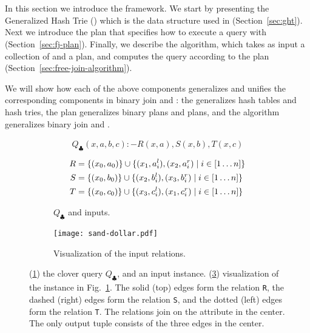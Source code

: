 \section{\FJ}\label{sec:free-join}

In this section we introduce the \FJ framework.
We start by presenting the Generalized Hash Trie (\GHT) which
 is the data structure used in \FJ (Section~\ref{sec:ght}).
Next we introduce the \FJ plan that specifies 
  how to execute a query with \FJ (Section~\ref{sec:fj-plan}).
Finally, we describe the \FJ algorithm, 
  which takes as input a collection of \GHTs 
  and a \FJ plan,
  and computes the query according to the plan (Section~\ref{sec:free-join-algorithm}).
  
We will show how each of the above components generalizes 
  and unifies the corresponding components in binary join 
  and \GJ: 
  the \GHT generalizes hash tables and hash tries,
  the \FJ plan generalizes binary plans and \GJ plans, and
  the \FJ algorithm generalizes binary join and \GJ.

\begin{figure}
\begin{subfigure}[b]{0.4\linewidth}
\begin{align*}
  Q_{\clubsuit}(x,a,b,c) :- R(x,a),S(x,b),T(x,c)
\end{align*}
\begin{align*}
  R & = \{(x_0, a_0)\} \cup \{{(x_1, a_i^l), (x_2, a_i^r)}\mid{i \in [1 \ldots n]}\} \\
  S & = \{(x_0, b_0)\} \cup \{{(x_2, b_i^l), (x_3, b_i^r)}\mid{i \in [1 \ldots n]}\} \\
  T & = \{(x_0, c_0)\} \cup \{{(x_3, c_i^l), (x_1, c_i^r)}\mid{i \in [1 \ldots n]}\} 
\end{align*}
\caption{$Q_\clubsuit$ and inputs.}
\label{fig:clover-query}
\end{subfigure}
\begin{subfigure}[b]{0.5\linewidth}
  \centering
  \texttt{[image: sand-dollar.pdf]}
  \caption{Visualization of the input relations.}
  \label{fig:clover-vis}
\end{subfigure}
\caption{(\ref{fig:clover-query}) the clover query $Q_\clubsuit$, and an input instance.
(\ref{fig:clover-vis}) visualization of the instance in
    Fig.~\ref{fig:clover-query}. The solid (top) edges form the relation
    \texttt{R}, the dashed (right) edges form the relation \texttt{S},
    and the dotted (left) edges form the relation \texttt{T}.  The
    relations join on the attribute in the center.  The only output
    tuple consists of the three edges in the center. }
\end{figure}

